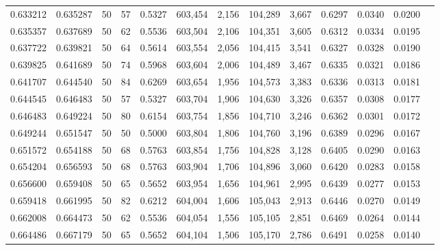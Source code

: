 \begin{tabular}{rrrrrrrrrrrrr}
0.633212 & 0.635287 &    50 &  57 &                                     0.5327 & 603,454 &   2,156 & 104,289 &   3,667 & 0.6297 & 0.0340 & 0.0200 \\
0.635357 & 0.637689 &    50 &  62 &                                     0.5536 & 603,504 &   2,106 & 104,351 &   3,605 & 0.6312 & 0.0334 & 0.0195 \\
0.637722 & 0.639821 &    50 &  64 &                                     0.5614 & 603,554 &   2,056 & 104,415 &   3,541 & 0.6327 & 0.0328 & 0.0190 \\
0.639825 & 0.641689 &    50 &  74 &                                     0.5968 & 603,604 &   2,006 & 104,489 &   3,467 & 0.6335 & 0.0321 & 0.0186 \\
0.641707 & 0.644540 &    50 &  84 &                                     0.6269 & 603,654 &   1,956 & 104,573 &   3,383 & 0.6336 & 0.0313 & 0.0181 \\
0.644545 & 0.646483 &    50 &  57 &                                     0.5327 & 603,704 &   1,906 & 104,630 &   3,326 & 0.6357 & 0.0308 & 0.0177 \\
0.646483 & 0.649224 &    50 &  80 &                                     0.6154 & 603,754 &   1,856 & 104,710 &   3,246 & 0.6362 & 0.0301 & 0.0172 \\
0.649244 & 0.651547 &    50 &  50 &                                     0.5000 & 603,804 &   1,806 & 104,760 &   3,196 & 0.6389 & 0.0296 & 0.0167 \\
0.651572 & 0.654188 &    50 &  68 &                                     0.5763 & 603,854 &   1,756 & 104,828 &   3,128 & 0.6405 & 0.0290 & 0.0163 \\
0.654204 & 0.656593 &    50 &  68 &                                     0.5763 & 603,904 &   1,706 & 104,896 &   3,060 & 0.6420 & 0.0283 & 0.0158 \\
0.656600 & 0.659408 &    50 &  65 &                                     0.5652 & 603,954 &   1,656 & 104,961 &   2,995 & 0.6439 & 0.0277 & 0.0153 \\
0.659418 & 0.661995 &    50 &  82 &                                     0.6212 & 604,004 &   1,606 & 105,043 &   2,913 & 0.6446 & 0.0270 & 0.0149 \\
0.662008 & 0.664473 &    50 &  62 &                                     0.5536 & 604,054 &   1,556 & 105,105 &   2,851 & 0.6469 & 0.0264 & 0.0144 \\
0.664486 & 0.667179 &    50 &  65 &                                     0.5652 & 604,104 &   1,506 & 105,170 &   2,786 & 0.6491 & 0.0258 & 0.0140 \\

\end{tabular}

